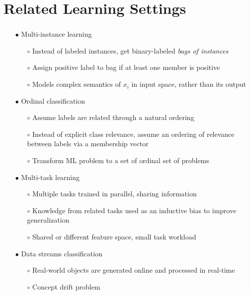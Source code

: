 \documentclass{beamer}
\begin{document}
\section{Related Learning Settings}
\begin{frame}
\frametitle{\insertsection}
\begin{itemize}
\item[$\bullet$] Multi-instance learning
\begin{itemize}
\item[$\circ$] Instead of labeled instances, get binary-labeled \emph{bags of instances}
\item[$\circ$] Assign positive label to bag if at least one member is positive
\item[$\circ$] Models complex semantics of $x_i$ in input space, rather than its output
\end{itemize}
\item[$\bullet$] Ordinal classification
\begin{itemize}
\item[$\circ$] Assume labels are related through a natural ordering
\item[$\circ$] Instead of explicit class relevance, assume an ordering of
  relevance between labels via a membership vector
\item[$\circ$] Transform ML problem to a set of ordinal set of problems
\end{itemize}
\item[$\bullet$] Multi-task learning
\begin{itemize}
\item[$\circ$] Multiple tasks trained in parallel, sharing information
\item[$\circ$] Knowledge from related tasks used as an inductive bias to improve generalization
\item[$\circ$] Shared or different feature space, small task workload
\end{itemize}
\item[$\bullet$] Data streams classification
\begin{itemize}
\item[$\circ$] Real-world objects are generated online and processed in  real-time
\item[$\circ$] Concept drift problem
\end{itemize}
\end{itemize}
\end{frame}
\end{document}
